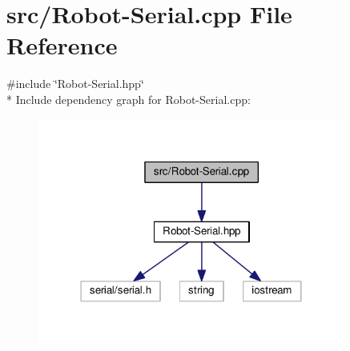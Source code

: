 \hypertarget{_robot-_serial_8cpp}{}\section{src/\+Robot-\/\+Serial.cpp File Reference}
\label{_robot-_serial_8cpp}
{\ttfamily \#include \char`\"{}Robot-\/\+Serial.\+hpp\char`\"{}}\\*
Include dependency graph for Robot-\/\+Serial.cpp\+:\nopagebreak
\begin{figure}[H]
\begin{center}
\leavevmode
\includegraphics[width=286pt]{_robot-_serial_8cpp__incl}
\end{center}
\end{figure}

